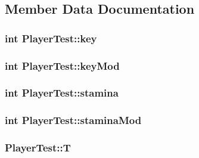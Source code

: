 \subsection{Member Data Documentation}
\hypertarget{classPlayerTest_aeba80cc755ca737972055b668af786f0}{
\subsubsection[{key}]{\setlength{\rightskip}{0pt plus 5cm}int Player\-Test\-::key\hspace{0.3cm}{\ttfamily [private]}}}\label{classPlayerTest_aeba80cc755ca737972055b668af786f0}
\hypertarget{classPlayerTest_ae4e634b9de6e1a835fead6433fb68108}{
\subsubsection[{key\-Mod}]{\setlength{\rightskip}{0pt plus 5cm}int Player\-Test\-::key\-Mod\hspace{0.3cm}{\ttfamily [private]}}}\label{classPlayerTest_ae4e634b9de6e1a835fead6433fb68108}
\hypertarget{classPlayerTest_a21d883f41fe9bc9fec5aafc6377aca6a}{
\subsubsection[{stamina}]{\setlength{\rightskip}{0pt plus 5cm}int Player\-Test\-::stamina\hspace{0.3cm}{\ttfamily [private]}}}\label{classPlayerTest_a21d883f41fe9bc9fec5aafc6377aca6a}
\hypertarget{classPlayerTest_a34b22c1470a735f5000b85c8a35c09d6}{
\subsubsection[{stamina\-Mod}]{\setlength{\rightskip}{0pt plus 5cm}int Player\-Test\-::stamina\-Mod\hspace{0.3cm}{\ttfamily [private]}}}\label{classPlayerTest_a34b22c1470a735f5000b85c8a35c09d6}
\hypertarget{classPlayerTest_aa4d4751434ca1508f9962ffc03c37447}{
\subsubsection[{T}]{ Player\-Test\-::\-T\hspace{0.3cm}{\ttfamily [private]}}}\label{classPlayerTest_aa4d4751434ca1508f9962ffc03c37447}


